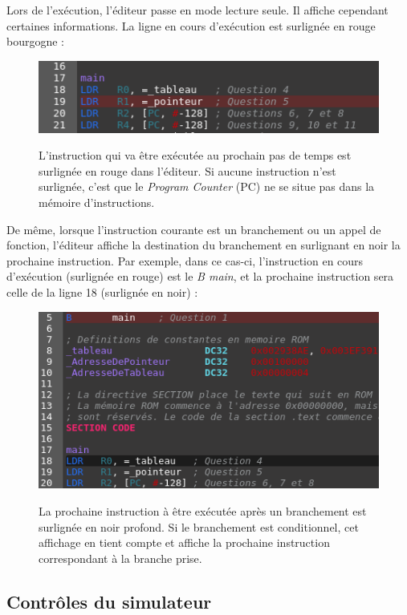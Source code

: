 \documentclass{tufte-handout}
\begin{document}
Lors de l'exécution, l'éditeur passe en mode lecture seule. Il affiche cependant certaines informations. La ligne en cours d'exécution est surlignée en rouge bourgogne :
\begin{figure}[h!]
\raggedleft
\includegraphics[width=0.9\linewidth]{pics/editeur_lignecourante.png}
\label{f:editeurlignecourante}
\caption{L'instruction qui va être exécutée au prochain pas de temps est surlignée en rouge dans l'éditeur. Si aucune instruction n'est surlignée, c'est que le \textit{Program Counter} (PC) ne se situe pas dans la mémoire d'instructions.}
\end{figure}

De même, lorsque l'instruction courante est un branchement ou un appel de fonction, l'éditeur affiche la destination du branchement en surlignant en noir la prochaine instruction. Par exemple, dans ce cas-ci, l'instruction en cours d'exécution (surlignée en rouge) est le \textit{B main}, et la prochaine instruction sera celle de la ligne 18 (surlignée en noir) :
\begin{figure}[h!]
\raggedleft
\includegraphics[width=0.9\linewidth]{pics/editeur_prediction.png}
\label{f:editeurbranch}
\caption{La prochaine instruction à être exécutée après un branchement est surlignée en noir profond. Si le branchement est conditionnel, cet affichage en tient compte et affiche la prochaine instruction correspondant à la branche prise.}
\end{figure}

\subsection{Contrôles du simulateur}
\end{document}
